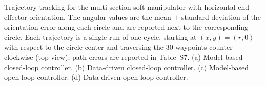 \caption{Trajectory tracking for the multi-section soft manipulator with horizontal end-effector orientation. The angular values are the mean $\pm$ standard deviation of the orientation error along each circle and are reported next to the corresponding circle. Each trajectory is a single run of one cycle, starting at $(x, y) = (r, 0)$ with respect to the circle center and traversing the 30 waypoints counter-clockwise (top view); path errors are reported in Table~S7. (a) Model-based closed-loop controller. (b) Data-driven closed-loop controller. (c) Model-based open-loop controller. (d) Data-driven open-loop controller.}
